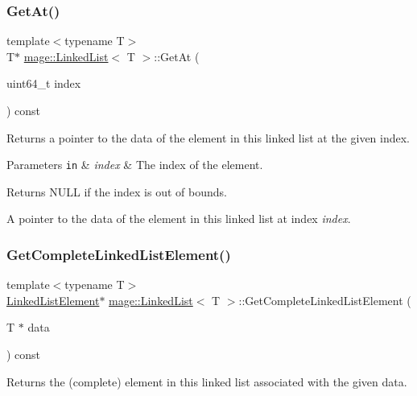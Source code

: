 \subsubsection{\texorpdfstring{Get\+At()}{GetAt()}}
{\footnotesize\ttfamily template$<$typename T$>$ \\
T$\ast$ \hyperlink{classmage_1_1_linked_list}{mage\+::\+Linked\+List}$<$ T $>$\+::Get\+At (\begin{DoxyParamCaption}\item[{uint64\+\_\+t}]{index }\end{DoxyParamCaption}) const}

Returns a pointer to the data of the element in this linked list at the given index.


\begin{DoxyParams}[1]{Parameters}
\mbox{\tt in}  & {\em index} & The index of the element. \\
\hline
\end{DoxyParams}
\begin{DoxyReturn}{Returns}
{\ttfamily N\+U\+LL} if the index is out of bounds. 

A pointer to the data of the element in this linked list at index {\itshape index}. 
\end{DoxyReturn}
\hypertarget{classmage_1_1_linked_list_a0da4ff247abafd3a496b379673c111c1}{}\label{classmage_1_1_linked_list_a0da4ff247abafd3a496b379673c111c1} 
\subsubsection{\texorpdfstring{Get\+Complete\+Linked\+List\+Element()}{GetCompleteLinkedListElement()}}
{\footnotesize\ttfamily template$<$typename T$>$ \\
\hyperlink{structmage_1_1_linked_list_1_1_linked_list_element}{Linked\+List\+Element}$\ast$ \hyperlink{classmage_1_1_linked_list}{mage\+::\+Linked\+List}$<$ T $>$\+::Get\+Complete\+Linked\+List\+Element (\begin{DoxyParamCaption}\item[{T $\ast$}]{data }\end{DoxyParamCaption}) const}

Returns the (complete) element in this linked list associated with the given data.


